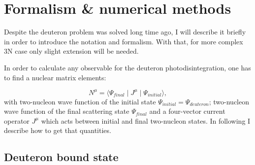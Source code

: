 \chapter{Formalism \& numerical methods}

Despite the deuteron problem was solved long time ago, I will describe it briefly 
in order to introduce the notation and formalism. 
With that, for more complex 3N case only slight 
extension will be needed.

In order to calculate any observable for the deuteron photodisintegration,
one has to find a nuclear matrix elements:

\begin{equation}
    N^\mu = \langle \Psi_{final} \mid J^\mu \mid \Psi_{initial} \rangle, 
    \label{main}
\end{equation}
with two-nucleon wave function of the initial state $\Psi_{initial}  = \Psi_{deuteron}$;
two-nucleon wave function of the final scattering state $\Psi_{final}$ 
and a four-vector current operator $J^\mu$ which acts between initial and final 
two-nucleon states. In following I describe how to get that quantities.




\section{Deuteron bound state}
    \label{sec:deut_bound}

